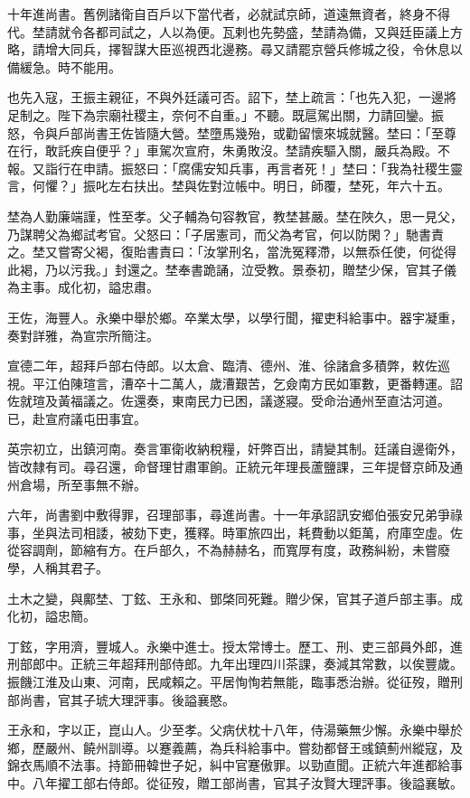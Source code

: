 \begin{pinyinscope}
十年進尚書。舊例諸衛自百戶以下當代者，必就試京師，道遠無資者，終身不得代。埜請就令各都司試之，人以為便。瓦剌也先勢盛，埜請為備，又與廷臣議上方略，請增大同兵，擇智謀大臣巡視西北邊務。尋又請罷京營兵修城之役，令休息以備緩急。時不能用。

也先入寇，王振主親征，不與外廷議可否。詔下，埜上疏言：「也先入犯，一邊將足制之。陛下為宗廟社稷主，奈何不自重。」不聽。既扈駕出關，力請回鑾。振怒，令與戶部尚書王佐皆隨大營。埜墮馬幾殆，或勸留懷來城就醫。埜曰：「至尊在行，敢託疾自便乎？」車駕次宣府，朱勇敗沒。埜請疾驅入關，嚴兵為殿。不報。又詣行在申請。振怒曰：「腐儒安知兵事，再言者死！」埜曰：「我為社稷生靈言，何懼？」振叱左右扶出。埜與佐對泣帳中。明日，師覆，埜死，年六十五。

埜為人勤廉端謹，性至孝。父子輔為句容教官，教埜甚嚴。埜在陜久，思一見父，乃謀聘父為鄉試考官。父怒曰：「子居憲司，而父為考官，何以防閑？」馳書責之。埜又嘗寄父褐，復貽書責曰：「汝掌刑名，當洗冤釋滯，以無忝任使，何從得此褐，乃以污我。」封還之。埜奉書跪誦，泣受教。景泰初，贈埜少保，官其子儀為主事。成化初，謚忠肅。

王佐，海豐人。永樂中舉於鄉。卒業太學，以學行聞，擢吏科給事中。器宇凝重，奏對詳雅，為宣宗所簡注。

宣德二年，超拜戶部右侍郎。以太倉、臨清、德州、淮、徐諸倉多積弊，敕佐巡視。平江伯陳瑄言，漕卒十二萬人，歲漕艱苦，乞僉南方民如軍數，更番轉運。詔佐就瑄及黃福議之。佐還奏，東南民力已困，議遂寢。受命治通州至直沽河道。已，赴宣府議屯田事宜。

英宗初立，出鎮河南。奏言軍衛收納稅糧，奸弊百出，請變其制。廷議自邊衛外，皆改隸有司。尋召還，命督理甘肅軍餉。正統元年理長蘆鹽課，三年提督京師及通州倉場，所至事無不辦。

六年，尚書劉中敷得罪，召理部事，尋進尚書。十一年承詔訊安鄉伯張安兄弟爭祿事，坐與法司相諉，被劾下吏，獲釋。時軍旅四出，耗費動以鉅萬，府庫空虛。佐從容調劑，節縮有方。在戶部久，不為赫赫名，而寬厚有度，政務糾紛，未嘗廢學，人稱其君子。

土木之變，與鄺埜、丁鉉、王永和、鄧棨同死難。贈少保，官其子道戶部主事。成化初，謚忠簡。

丁鉉，字用濟，豐城人。永樂中進士。授太常博士。歷工、刑、吏三部員外郎，進刑部郎中。正統三年超拜刑部侍郎。九年出理四川茶課，奏減其常數，以俟豐歲。振饑江淮及山東、河南，民咸賴之。平居恂恂若無能，臨事悉治辦。從征歿，贈刑部尚書，官其子琥大理評事。後謚襄愍。

王永和，字以正，崑山人。少至孝。父病伏枕十八年，侍湯藥無少懈。永樂中舉於鄉，歷嚴州、饒州訓導。以蹇義薦，為兵科給事中。嘗劾都督王彧鎮薊州縱寇，及錦衣馬順不法事。持節冊韓世子妃，糾中官蹇傲罪。以勁直聞。正統六年進都給事中。八年擢工部右侍郎。從征歿，贈工部尚書，官其子汝賢大理評事。後謚襄敏。


\end{pinyinscope}
